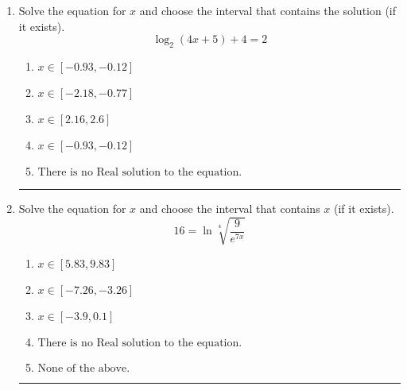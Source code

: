\documentclass[14pt]{extbook}
\newcommand{\litem}[1]{\item#1\hspace*{-1cm}\rule{\textwidth}{0.4pt}}
\begin{document}
\begin{enumerate}
{\begin{enumerate}[label=\Alph*.]
\end{enumerate} }
\litem{
Solve the equation for $x$ and choose the interval that contains the solution (if it exists).\[ \log_{2}{(4x+5)}+4 = 2 \]\begin{enumerate}[label=\Alph*.]
\item \( x \in [-0.93, -0.12] \)
\item \( x \in [-2.18, -0.77] \)
\item \( x \in [2.16, 2.6] \)
\item \( x \in [-0.93, -0.12] \)
\item \( \text{There is no Real solution to the equation.} \)

\end{enumerate} }
\litem{
 Solve the equation for $x$ and choose the interval that contains $x$ (if it exists).\[  16 = \ln{\sqrt[4]{\frac{9}{e^{7x}}}} \]\begin{enumerate}[label=\Alph*.]
\item \( x \in [5.83, 9.83] \)
\item \( x \in [-7.26, -3.26] \)
\item \( x \in [-3.9, 0.1] \)
\item \( \text{There is no Real solution to the equation.} \)
\item \( \text{None of the above.} \)

\end{enumerate} }
\end{enumerate}
\end{document}
